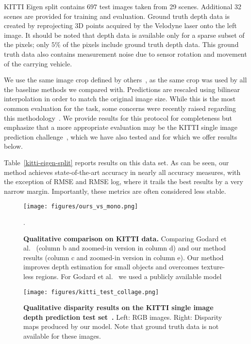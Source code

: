 \documentclass[10pt,twocolumn,letterpaper]{article}
\begin{document}
KITTI Eigen split contains $697$ test images taken from 29 scenes. Additional 32 scenes are provided for training and evaluation. Ground truth depth data is created by reprojecting 3D points acquired by the Velodyne laser onto the left image. It should be noted that depth data is available only for a sparse subset of the pixels; only $5\%$ of the pixels include ground truth depth data. This ground truth data also contains measurement noise due to sensor rotation and movement of the carrying vehicle.

We use the same image crop defined by others~\cite{garg2016unsupervised}, as the same crop was used by all the baseline methods we compared with. Predictions are rescaled using bilinear interpolation in order to match the original image size. While this is the most common evaluation for the task, some concerns were recently raised regarding this methodology~\cite{godard2018digging}. We provide results for this protocol for completeness but emphasize that a more appropriate evaluation may be the KITTI single image prediction challenge~\cite{uhrig2017sparsity}, which we have also tested and for which we offer results below.

Table~\ref{kitti-eigen-split} reports results on this data set. As can be seen, our method achieves state-of-the-art accuracy in nearly all accuracy measures, with the exception of RMSE and RMSE log, where it trails the best results by a very narrow margin. Importantly, these metrics are often considered less stable.

\begin{figure*}
	\centering
	\texttt{[image: figures/ours\_vs\_mono.png]}
	\caption{{\bf Qualitative comparison on KITTI data.} Comparing Godard et al.~\cite{monodepth17} (column b and zoomed-in version in column d) and our method results (column c and zoomed-in version in column e). Our method improves depth estimation for small objects and overcomes texture-less regions. For Godard et al.~\cite{monodepth17} we used a publicly available model~\cite{city2eigen_resnet}}.
\end{figure*}


\begin{figure}[t]
	\centering
	\texttt{[image: figures/kitti\_test\_collage.png]}
	\caption{{\bf Qualitative disparity results on the KITTI single image depth prediction test set~\cite{uhrig2017sparsity}.} Left: RGB images. Right: Disparity maps produced by our model. Note that ground truth data is not available for these images.\vspace{-2mm}}
	\label{fig:kitti_test}
\end{figure}
\end{document}
